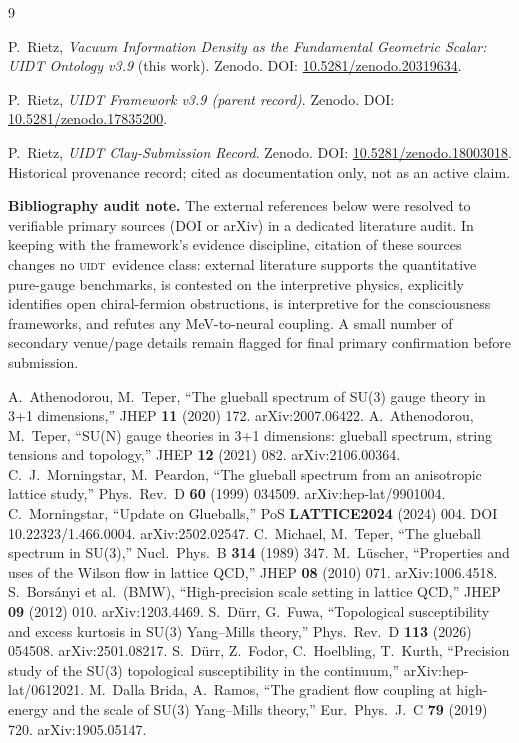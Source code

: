 \documentclass[12pt,a4paper,twoside]{article}
\theoremstyle{plain}
\theoremstyle{definition}
\theoremstyle{remark}
\newcommand{\UIDT}{\textsc{uidt}} %
\begin{document}
\begin{thebibliography}{9}
\footnotesize

P.~Rietz, \textit{Vacuum Information Density as the Fundamental Geometric Scalar: UIDT Ontology v3.9} (this work). Zenodo. DOI: \href{https://doi.org/10.5281/zenodo.20319634}{10.5281/zenodo.20319634}.

P.~Rietz, \textit{UIDT Framework v3.9 (parent record)}. Zenodo. DOI: \href{https://doi.org/10.5281/zenodo.17835200}{10.5281/zenodo.17835200}.

P.~Rietz, \textit{UIDT Clay-Submission Record}. Zenodo. DOI: \href{https://doi.org/10.5281/zenodo.18003018}{10.5281/zenodo.18003018}. Historical provenance record; cited as documentation only, not as an active claim.

\textbf{Bibliography audit note.} The external references below were resolved to verifiable primary sources (DOI or arXiv) in a dedicated literature audit. In keeping with the framework's evidence discipline, citation of these sources changes no \UIDT\ evidence class: external literature supports the quantitative pure-gauge benchmarks, is contested on the interpretive physics, explicitly identifies open chiral-fermion obstructions, is interpretive for the consciousness frameworks, and refutes any MeV-to-neural coupling. A small number of secondary venue/page details remain flagged for final primary confirmation before submission.

A.~Athenodorou, M.~Teper, ``The glueball spectrum of SU(3) gauge theory in 3+1 dimensions,'' JHEP \textbf{11} (2020) 172. arXiv:2007.06422.
A.~Athenodorou, M.~Teper, ``SU(N) gauge theories in 3+1 dimensions: glueball spectrum, string tensions and topology,'' JHEP \textbf{12} (2021) 082. arXiv:2106.00364.
C.~J.~Morningstar, M.~Peardon, ``The glueball spectrum from an anisotropic lattice study,'' Phys.\ Rev.\ D \textbf{60} (1999) 034509. arXiv:hep-lat/9901004.
C.~Morningstar, ``Update on Glueballs,'' PoS \textbf{LATTICE2024} (2024) 004. DOI 10.22323/1.466.0004. arXiv:2502.02547.
C.~Michael, M.~Teper, ``The glueball spectrum in SU(3),'' Nucl.\ Phys.\ B \textbf{314} (1989) 347.
M.~L\"uscher, ``Properties and uses of the Wilson flow in lattice QCD,'' JHEP \textbf{08} (2010) 071. arXiv:1006.4518.
S.~Bors\'anyi et al.\ (BMW), ``High-precision scale setting in lattice QCD,'' JHEP \textbf{09} (2012) 010. arXiv:1203.4469.
S.~D\"urr, G.~Fuwa, ``Topological susceptibility and excess kurtosis in SU(3) Yang--Mills theory,'' Phys.\ Rev.\ D \textbf{113} (2026) 054508. arXiv:2501.08217.
S.~D\"urr, Z.~Fodor, C.~Hoelbling, T.~Kurth, ``Precision study of the SU(3) topological susceptibility in the continuum,'' arXiv:hep-lat/0612021.
M.~Dalla Brida, A.~Ramos, ``The gradient flow coupling at high-energy and the scale of SU(3) Yang--Mills theory,'' Eur.\ Phys.\ J.\ C \textbf{79} (2019) 720. arXiv:1905.05147.


\end{thebibliography}
\end{document}
